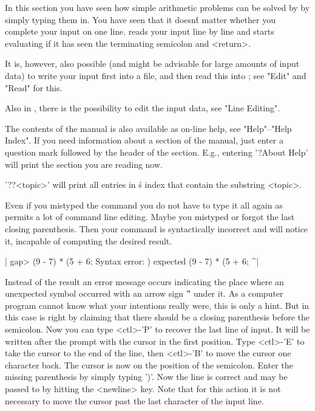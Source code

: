 In  this  section you  have  seen how simple  arithmetic  problems can be
solved by  {\GAP} by  simply  typing  them in.   You have  seen  that  it
doesn\'t  matter whether you complete  your  input on  one  line.  {\GAP}
reads  your input line  by line and starts evaluating if it  has seen the
terminating semicolon and <return>.

It is, however, also  possible (and might be  advisable for large amounts
of input data) to write your input first  into a file, and then read this
into {\GAP}; see "Edit" and "Read" for this.

Also  in {\GAP}, there is the  possibility  to edit  the input  data, see
"Line Editing".


The contents of the {\GAP}  manual is also available as on-line help, see
"Help"--"Help Index".  If  you need  information  about a section  of the
manual, just enter a question mark followed by the header of the section.
E.g.,  entering '?About Help' will print the section you are reading now.

'??<topic>' will  print all  entries in {\GAP}\'s index that  contain the
substring <topic>.


Even if you mistyped the command you do not have to  type it all again as
{\GAP}  permits a lot of  command  line editing.   Maybe you mistyped  or
forgot the last closing parenthesis.  Then  your command is syntactically
incorrect and  {\GAP} will  notice it, incapable of computing the desired
result.

|    gap> (9 - 7) * (5 + 6;
    Syntax error: ) expected
    (9 - 7) * (5 + 6;
                    ^|

Instead of the result an error message occurs  indicating the place where
an unexpected  symbol  occurred with  an arrow sign '\^' under  it.  As a
computer program cannot know  what  your  intentions really were, this is
only a hint.  But  in this  case {\GAP} is right  by  claiming that there
should be a closing  parenthesis before the semicolon.  Now  you can type
<ctl>-'P' to  recover the last line of  input.  It  will be written after
the prompt with the cursor in the first position.  Type <ctl>-'E' to take
the cursor  to the end of the line, then <ctl>-'B' to move the cursor one
character  back.  The  cursor  is  now  on the position of the semicolon.
Enter  the missing  parenthesis  by simply typing ')'.  Now  the  line is
correct and may be passed to {\GAP} by  hitting  the <newline> key.  Note
that for this action it is not necessary to move the cursor past the last
character of the input line.

